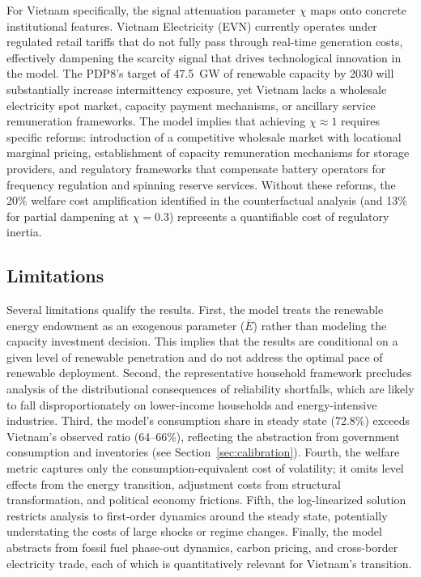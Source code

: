 \documentclass[12pt, a4paper]{article}
\begin{document}
For Vietnam specifically, the signal attenuation parameter $\chi$ maps onto concrete institutional features. Vietnam Electricity (EVN) currently operates under regulated retail tariffs that do not fully pass through real-time generation costs, effectively dampening the scarcity signal that drives technological innovation in the model. The PDP8's target of 47.5~GW of renewable capacity by 2030 will substantially increase intermittency exposure, yet Vietnam lacks a wholesale electricity spot market, capacity payment mechanisms, or ancillary service remuneration frameworks. The model implies that achieving $\chi \approx 1$ requires specific reforms: introduction of a competitive wholesale market with locational marginal pricing, establishment of capacity remuneration mechanisms for storage providers, and regulatory frameworks that compensate battery operators for frequency regulation and spinning reserve services. Without these reforms, the 20\% welfare cost amplification identified in the counterfactual analysis (and 13\% for partial dampening at $\chi = 0.3$) represents a quantifiable cost of regulatory inertia.

\subsection*{Limitations}

Several limitations qualify the results. First, the model treats the renewable energy endowment as an exogenous parameter ($\bar{E}$) rather than modeling the capacity investment decision. This implies that the results are conditional on a given level of renewable penetration and do not address the optimal pace of renewable deployment. Second, the representative household framework precludes analysis of the distributional consequences of reliability shortfalls, which are likely to fall disproportionately on lower-income households and energy-intensive industries. Third, the model's consumption share in steady state (72.8\%) exceeds Vietnam's observed ratio (64--66\%), reflecting the abstraction from government consumption and inventories (see Section~\ref{sec:calibration}). Fourth, the welfare metric captures only the consumption-equivalent cost of volatility; it omits level effects from the energy transition, adjustment costs from structural transformation, and political economy frictions. Fifth, the log-linearized solution restricts analysis to first-order dynamics around the steady state, potentially understating the costs of large shocks or regime changes. Finally, the model abstracts from fossil fuel phase-out dynamics, carbon pricing, and cross-border electricity trade, each of which is quantitatively relevant for Vietnam's transition.
\end{document}
